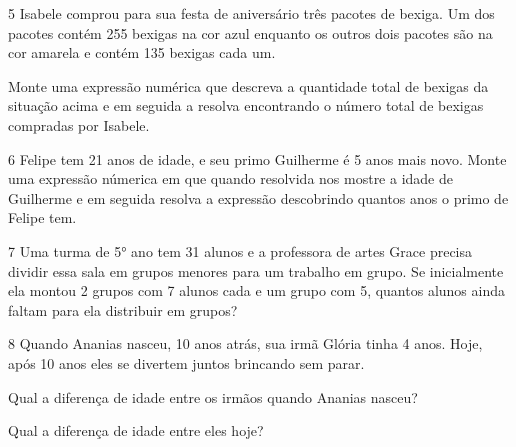 \num{5} Isabele comprou para sua festa de aniversário três pacotes de
bexiga. Um dos pacotes contém 255 bexigas na cor azul enquanto os outros
dois pacotes são na cor amarela e contém 135 bexigas cada um.

Monte uma expressão numérica que descreva a quantidade total de bexigas
da situação acima e em seguida a resolva encontrando o número total de
bexigas compradas por Isabele.



\num{6} Felipe tem 21 anos de idade, e seu primo Guilherme é 5 anos mais
novo. Monte uma expressão númerica em que quando resolvida nos mostre a
idade de Guilherme e em seguida resolva a expressão descobrindo quantos
anos o primo de Felipe tem.



\num{7} Uma turma de 5° ano tem 31 alunos e a professora de artes Grace
precisa dividir essa sala em grupos menores para um trabalho em grupo.
Se inicialmente ela montou 2 grupos com 7 alunos cada e um grupo com 5,
quantos alunos ainda faltam para ela distribuir em grupos?



\num{8} Quando Ananias nasceu, 10 anos atrás, sua irmã Glória tinha 4 anos.
Hoje, após 10 anos eles se divertem juntos brincando sem parar.

\begin{escolha}
\item
  Qual a diferença de idade entre os irmãos quando Ananias nasceu?


\item
  Qual a diferença de idade entre eles hoje?

\end{escolha}


